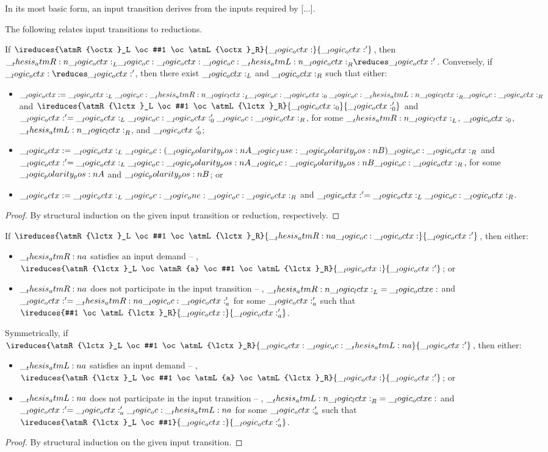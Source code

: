 In its most basic form, an input transition derives from the inputs required by [...].

The following  relates input transitions to reductions.
\begin{theorem}\label{thm:input-transition-reduction}
  If $\ireduces{\atmR{\octx}_L \oc #1 \oc \atmL{\octx}_R}{\octx}{\octx'}$, then $\atmR{\octx}_L \oc \octx \oc \atmL{\octx}_R \reduces \octx'$.
  Conversely, if $\octx \reduces \octx'$, then there exist $\__logic_octx:_L$ and $\__logic_octx:_R$ such that either:
  \begin{itemize}
  \item $\__logic_octx: = \__logic_octx:_L \__logic_oc: \__thesis_atmR:n {\__logic_lctx:}_L \__logic_oc: \__logic_octx:_0 \__logic_oc: \__thesis_atmL:n {\__logic_lctx:}_R \__logic_oc: \__logic_octx:_R$ and $\ireduces{\atmR{\lctx}_L \oc #1 \oc \atmL{\lctx}_R}{\octx_0}{\octx'_0}$ and $\__logic_octx:' = \__logic_octx:_L \__logic_oc: \__logic_octx:'_0 \__logic_oc: \__logic_octx:_R$, for some $\__thesis_atmR:n {\__logic_lctx:}_L$, $\__logic_octx:_0$, $\__thesis_atmL:n {\__logic_lctx:}_R$, and $\__logic_octx:'_0$;
  \item $\__logic_octx: = \__logic_octx:_L \__logic_oc: (\__logic_polarity_pos:n {A} \__logic_fuse: \__logic_polarity_pos:n {B}) \__logic_oc: \__logic_octx:_R$ and $\__logic_octx:' = \__logic_octx:_L \__logic_oc: \__logic_polarity_pos:n {A} \__logic_oc: \__logic_polarity_pos:n {B} \__logic_oc: \__logic_octx:_R$, for some $\__logic_polarity_pos:n {A}$ and $\__logic_polarity_pos:n {B}$; or
  \item $\__logic_octx: = \__logic_octx:_L \__logic_oc: \__logic_one: \__logic_oc: \__logic_octx:_R$ and $\__logic_octx:' = \__logic_octx:_L \__logic_oc: \__logic_octx:_R$.
  \end{itemize}
\end{theorem}
\begin{proof}
  By structural induction on the given input transition or reduction, respectively.
\end{proof}

\begin{lemma}\label{lem:input-framing}
  If $\ireduces{\atmR{\lctx}_L \oc #1 \oc \atmL{\lctx}_R}{\atmR{a} \oc \octx}{\octx'}$, then either:
  \begin{itemize}[nosep]
  \item $\__thesis_atmR:n {a}$ satisfies an input demand -- \ie, $\ireduces{\atmR{\lctx}_L \oc \atmR{a} \oc #1 \oc \atmL{\lctx}_R}{\octx}{\octx'}$; or
  \item $\__thesis_atmR:n {a}$ does not participate in the input transition -- \ie, $\__thesis_atmR:n {\__logic_lctx:}_L = \__logic_octxe:$ and $\__logic_octx:' = \__thesis_atmR:n {a} \__logic_oc: \__logic_octx:'_a$ for some $\__logic_octx:'_a$ such that $\ireduces{#1 \oc \atmL{\lctx}_R}{\octx}{\octx'_a}$.
  \end{itemize}
  Symmetrically, if $\ireduces{\atmR{\lctx}_L \oc #1 \oc \atmL{\lctx}_R}{\octx \oc \atmL{a}}{\octx'}$, then either:
  \begin{itemize}[nosep]
  \item $\__thesis_atmL:n {a}$ satisfies an input demand -- \ie, $\ireduces{\atmR{\lctx}_L \oc #1 \oc \atmL{a} \oc \atmL{\lctx}_R}{\octx}{\octx'}$; or
  \item $\__thesis_atmL:n {a}$ does not participate in the input transition -- \ie, $\__thesis_atmL:n {\__logic_lctx:}_R = \__logic_octxe:$ and $\__logic_octx:' = \__logic_octx:'_a \__logic_oc: \__thesis_atmL:n {a}$ for some $\__logic_octx:'_a$ such that $\ireduces{\atmR{\lctx}_L \oc #1}{\octx}{\octx'_a}$.
  \end{itemize}
\end{lemma}
\begin{proof}
  By structural induction on the given input transition.
\end{proof}

